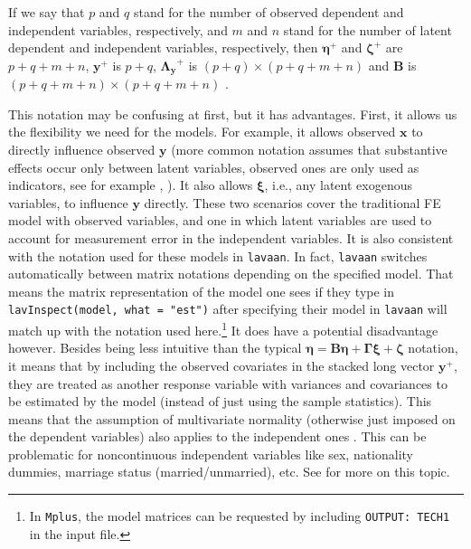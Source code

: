 \documentclass[]{interact}
\theoremstyle{plain}%
\theoremstyle{definition}
\theoremstyle{remark}
\begin{document}
If we say that \(p\) and \(q\) stand for the number of observed
dependent and independent variables, respectively, and \(m\) and \(n\)
stand for the number of latent dependent and independent variables,
respectively, then \(\bm{\eta}^{+}\) and \(\bm{\zeta}^{+}\) are
\(p + q + m + n\), \(\bm{y}^{+}\) is \(p + q\), \(\bm{\Lambda_{y}}^{+}\)
is \((p + q) \times (p + q + m + n)\) and \(\bm{B}\) is
\((p + q + m + n) \times (p + q + m + n)\) \citep{Bollen1989}.

This notation may be confusing at first, but it has advantages. First,
it allows us the flexibility we need for the models. For example, it
allows observed \(\bm{x}\) to directly influence observed \(\bm{y}\)
(more common notation assumes that substantive effects occur only
between latent variables, observed ones are only used as indicators, see
for example \citet{Bollen1989}, \citet{Kline2016}). It also allows
\(\bm{\xi}\), i.e., any latent exogenous variables, to influence
\(\bm{y}\) directly. These two scenarios cover the traditional FE model
with observed variables, and one in which latent variables are used to
account for measurement error in the independent variables. It is also
consistent with the notation used for these models in \texttt{lavaan}.
In fact, \texttt{lavaan} switches automatically between matrix notations
depending on the specified model. That means the matrix representation
of the model one sees if they type in
\texttt{lavInspect(model,\ what\ =\ "est")} after specifying their model
in \texttt{lavaan} will match up with the notation used here.\footnote{In
  \texttt{Mplus}, the model matrices can be requested by including
  \texttt{OUTPUT:\ TECH1} in the input file.} It does have a potential
disadvantage however. Besides being less intuitive than the typical
\(\bm{\eta} = \bm{B}\bm{\eta} + \bm{\Gamma}\bm{\xi} + \bm{\zeta}\)
notation, it means that by including the observed covariates in the
stacked long vector \(\bm{y}^{+}\), they are treated as another response
variable with variances and covariances to be estimated by the model
(instead of just using the sample statistics). This means that the
assumption of multivariate normality (otherwise just imposed on the
dependent variables) also applies to the independent ones
\citep[p.~75]{Skrondal2004}. This can be problematic for noncontinuous
independent variables like sex, nationality dummies, marriage status
(married/unmarried), etc. See \citet{Skrondal2004} for more on this
topic.
\end{document}
